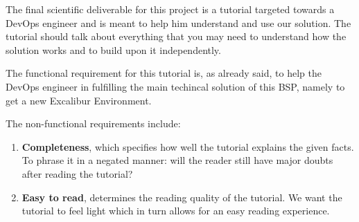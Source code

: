 
The final scientific deliverable for this project is a tutorial
targeted towards a DevOps engineer and is meant to help him understand
and use our solution. The tutorial should talk about everything that
you may need to understand how the solution works and to build upon it
independently.

The functional requirement for this tutorial is, as already said, to
help the DevOps engineer in fulfilling the main techincal solution of
this BSP, namely to get a new Excalibur Environment.

The non-functional requirements include:
\begin{enumerate}
	\item \textbf{Completeness}, which specifies how well the tutorial
		 explains the given facts. To phrase it in a negated manner:
		 will the reader still have major doubts after reading the
		 tutorial?
	\item \textbf{Easy to read}, determines the reading quality of
		the tutorial.  We want the tutorial to feel light which in
		turn allows for an easy reading experience.
\end{enumerate}
